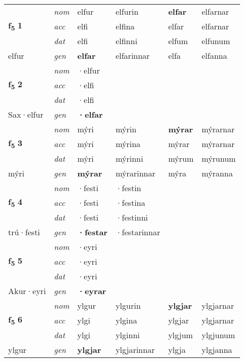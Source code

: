 \begin{longtable}[l]{X>{\footnotesize\itshape}XXXXX}
\multirow{3}{*}{{{\textbf{f{\textsubscript{5}}} \Large{\textbf{1}}}}} & nom & elfur & elfurin & \textbf{elfar} & elfarnar \\*
 & acc & elfi & elfina & elfar & elfarnar \\*
 & dat & elfi & elfinni & elfum & elfunum \\*
 {\footnotesize{elfur}} & gen & \textbf{elfar} & elfarinnar & elfa & elfanna \\
\midrule

\multirow{3}{*}{{{\textbf{f{\textsubscript{5}}} \Large{\textbf{2}}}}} & nom & ·elfur &  & \textbf{} &  \\*
 & acc & ·elfi &  &  &  \\*
 & dat & ·elfi &  &  &  \\*
 {\footnotesize{Sax\allowbreak ·elfur}} & gen & \textbf{·elfar} &  &  &  \\
\midrule

\multirow{3}{*}{{{\textbf{f{\textsubscript{5}}} \Large{\textbf{3}}}}} & nom & mýri & mýrin & \textbf{mýrar} & mýrarnar \\*
 & acc & mýri & mýrina & mýrar & mýrarnar \\*
 & dat & mýri & mýrinni & mýrum & mýrunum \\*
 {\footnotesize{mýri}} & gen & \textbf{mýrar} & mýrarinnar & mýra & mýranna \\
\midrule

\multirow{3}{*}{{{\textbf{f{\textsubscript{5}}} \Large{\textbf{4}}}}} & nom & ·festi & ·festin & \textbf{} &  \\*
 & acc & ·festi & ·festina &  &  \\*
 & dat & ·festi & ·festinni &  &  \\*
 {\footnotesize{trú\allowbreak ·festi}} & gen & \textbf{·festar} & ·festarinnar &  &  \\
\midrule

\multirow{3}{*}{{{\textbf{f{\textsubscript{5}}} \Large{\textbf{5}}}}} & nom & ·eyri &  & \textbf{} &  \\*
 & acc & ·eyri &  &  &  \\*
 & dat & ·eyri &  &  &  \\*
 {\footnotesize{Akur\allowbreak ·eyri}} & gen & \textbf{·eyrar} &  &  &  \\
\midrule

\multirow{3}{*}{{{\textbf{f{\textsubscript{5}}} \Large{\textbf{6}}}}} & nom & ylgur & ylgurin & \textbf{ylgjar} & ylgjarnar \\*
 & acc & ylgi & ylgina & ylgjar & ylgjarnar \\*
 & dat & ylgi & ylginni & ylgjum & ylgjunum \\*
 {\footnotesize{ylgur}} & gen & \textbf{ylgjar} & ylgjarinnar & ylgja & ylgjanna \\
\midrule


\end{longtable}
